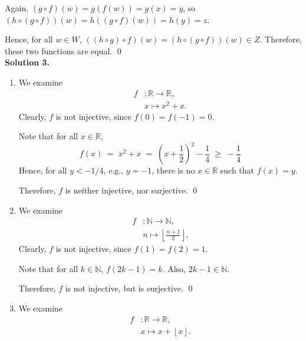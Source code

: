 \documentclass[10pt]{article}
\begin{document}
        Again, $(g\circ f)(w) = g(f(w)) = g(x) = y$, so $(h \circ (g\circ f))(w) = h((g\circ f)(w)) = h(y) = z$.

        Hence, for all $w \in W$, $((h\circ g)\circ f)(w) = (h\circ (g\circ f))(w) \in Z$.
        Therefore, these two functions are equal. \qed\\

        \textbf{Solution 3.}\\
        \begin{enumerate}
                \item We examine
                \begin{align*}
                        f&: \mathbb{R} \to \mathbb{R},\\
                        &x \mapsto x^2 + x.
                \end{align*}
                Clearly, $f$ is not injective, since $f(0) = f(-1) = 0$.
                
                Note that for all $x \in \mathbb{R}$,
                \[
                        f(x) \;=\; x^2 + x 
                                \;=\; \left(x + \frac{1}{2}\right)^2 - \frac{1}{4}
                                \;\geq\; -\frac{1}{4}
                \]
                Hence, for all $y < -1 /4$, e.g., $y = -1$, there is no $x \in \mathbb{R}$ such that $f(x) = y$.
                
                Therefore, $f$ is neither injective, nor surjective. \qed
                
                \item We examine
                \begin{align*}
                        f&: \mathbb{N} \to \mathbb{N},\\
                        &n \mapsto \left\lfloor \frac{n+1}{2}  \right\rfloor .
                \end{align*}
                Clearly, $f$ is not injective, since $f(1) = f(2) = 1$.

                Note that for all $k \in \mathbb{N}$, $f(2k - 1) = k$. Also, $2k-1 \in \mathbb{N}$.

                Therefore, $f$ is not injective, but is surjective. \qed
                
                \item We examine
                \begin{align*}
                        f&: \mathbb{R} \to \mathbb{R},\\
                        &x \mapsto x + \left\lfloor x \right\rfloor .
                \end{align*}


\end{enumerate}
\end{document}
